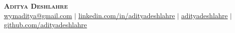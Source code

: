 \documentclass[letterpaper,11pt]{article}
\begin{document}

\begin{center}
    \textbf{\Huge \scshape Aditya Deshlahre} \\ \vspace{4pt}
    \small \href{mailto:wymaditya@gmail.com}{{wymaditya@gmail.com}} $|$ 
    \href{https://www.linkedin.com/in/adityadeshlahre/}{{\underline{linkedin.com/in/adityadeshlahre}}} $|$
    \href{https://x.com/adityadeshlahre}{{\underline{adityadeshlahre}}} $|$
    \href{https://github.com/adityadeshlahre}{{\underline{github.com/adityadeshlahre}}}
    
    
\end{center}


%


\end{document}
